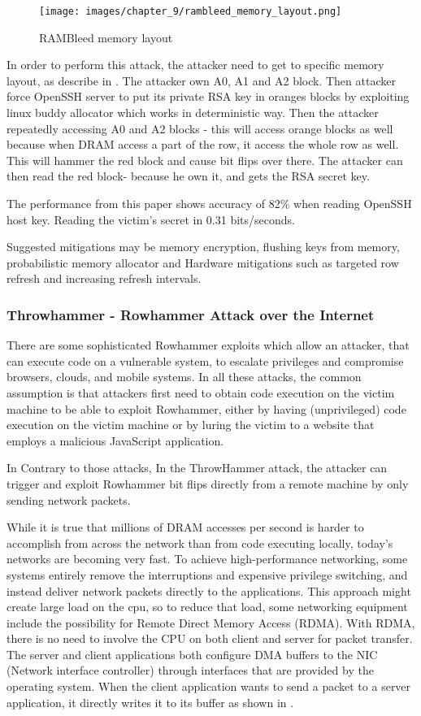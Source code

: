 \begin{figure}[!ht]
	\centering
	\texttt{[image: images/chapter\_9/rambleed\_memory\_layout.png]}
	\caption{RAMBleed memory layout}
	\label{fig:rambleed_memory_layout}
\end{figure}
In order to perform this attack, the attacker need to get to specific memory layout, as describe in . The attacker own A0, A1 and A2 block. Then attacker force OpenSSH server to put its private RSA key in oranges blocks by exploiting linux buddy allocator which works in deterministic way. Then the attacker repeatedly accessing A0 and A2 blocks - this will access orange blocks 
as well because when DRAM access a part of the row, it access the whole row as well. This will hammer the red block and cause bit flips over there. The attacker can then read the red block- because he own it, and gets the RSA secret key.

The performance from this paper shows accuracy of 82\% when reading OpenSSH host key. Reading the victim’s secret in 0.31 bits/seconds.

Suggested mitigations may be memory encryption, flushing keys from memory, probabilistic memory allocator and Hardware mitigations such as targeted row refresh and increasing refresh intervals.

\subsubsection{Throwhammer - Rowhammer Attack over the Internet ~\cite{throwhammer}}
There are some sophisticated Rowhammer exploits which allow an attacker, that can execute code on a vulnerable system, to escalate privileges and compromise browsers, clouds, and mobile systems. In all these attacks, the common assumption is that attackers first need to obtain code execution on the victim machine to be able to exploit Rowhammer, either by having (unprivileged) code execution on the victim machine or by luring the victim to a website that employs a malicious JavaScript application. 

In Contrary to those attacks, In the ThrowHammer attack, the attacker can trigger and exploit Rowhammer bit flips directly from a remote machine by only sending network packets.

While it is true that millions of DRAM accesses per second is harder to accomplish from across 
the network than from code executing locally, today’s networks are becoming very fast.
To achieve high-performance networking, some systems entirely remove the interruptions and
expensive privilege switching, and instead deliver network packets directly to the applications.
This approach might create large load on the cpu, so to reduce that load, some networking equipment include the possibility for Remote Direct Memory Access (RDMA).
With RDMA, there is no need to involve the CPU on both client and server for packet transfer. The server
and client applications both configure DMA buffers to the NIC (Network interface controller) through interfaces that are provided by the operating system. When the client application wants to send a packet to a server application, it directly writes it to its buffer as shown in .

